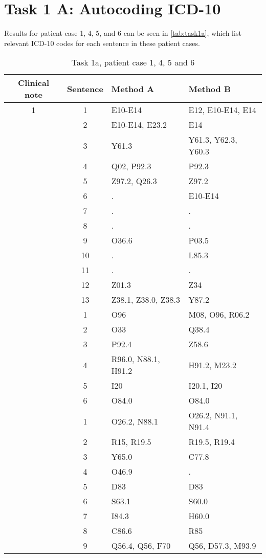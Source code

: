 \section{Task 1 A: Autocoding ICD-10}
Results for patient case 1, 4, 5, and 6 can be seen in \autoref{tab:task1a},
which list relevant ICD-10 codes for each sentence in these patient cases.
\begin{table}[htbp] \footnotesize \center
\caption{Task 1a, patient case 1, 4, 5 and 6\label{tab:task1a}}
\begin{tabular}{c c l l}
    \toprule
    Clinical note & Sentence & Method A & Method B \\
    \midrule
	1 & 1 & E10-E14 & E12, E10-E14, E14 \\
	 & 2 & E10-E14, E23.2 & E14 \\
	 & 3 & Y61.3 & Y61.3, Y62.3, Y60.3 \\
	 & 4 & Q02, P92.3 & P92.3 \\
	 & 5 & Z97.2, Q26.3 & Z97.2 \\
	 & 6 & . & E10-E14 \\
	 & 7 & . & . \\
	 & 8 & . & . \\
	 & 9 & O36.6 & P03.5 \\
	 & 10 & . & L85.3 \\
	 & 11 & . & . \\
	 & 12 & Z01.3 & Z34 \\
	 & 13 & Z38.1, Z38.0, Z38.3 & Y87.2 \\
	\addlinespace
	4 & 1 & O96 & M08, O96, R06.2 \\
	 & 2 & O33 & Q38.4 \\
	 & 3 & P92.4 & Z58.6 \\
	 & 4 & R96.0, N88.1, H91.2 & H91.2, M23.2 \\
	 & 5 & I20 & I20.1, I20 \\
	 & 6 & O84.0 & O84.0 \\
	\addlinespace
	5 & 1 & O26.2, N88.1 & O26.2, N91.1, N91.4 \\
	 & 2 & R15, R19.5 & R19.5, R19.4 \\
	 & 3 & Y65.0 & C77.8 \\
	 & 4 & O46.9 & . \\
	 & 5 & D83 & D83 \\
	 & 6 & S63.1 & S60.0 \\
	 & 7 & I84.3 & H60.0 \\
	 & 8 & C86.6 & R85 \\
	 & 9 & Q56.4, Q56, F70 & Q56, D57.3, M93.9 \\

\end{tabular}
\end{table}
